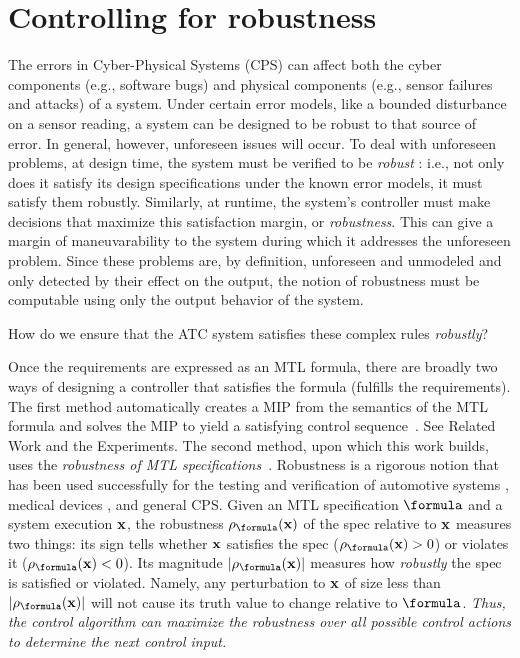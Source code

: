 \section{Controlling for robustness}
\label{sec:intro}
The errors in Cyber-Physical Systems (CPS) can affect both the cyber components (e.g., software bugs) and physical components (e.g., sensor failures and attacks) of a system. Under certain error models, like a bounded disturbance on a sensor reading, a system can be designed to be robust to that source of error.
In general, however, unforeseen issues will occur. 
To deal with unforeseen problems, at design time, the system must be verified to be \textit{robust} : i.e., not only does it satisfy its design specifications under the known error models, it must satisfy them robustly.
Similarly, at runtime, the system's controller must make decisions that maximize this satisfaction margin, or \textit{robustness}.
This can give a margin of maneuvarability to the system during which it addresses the unforeseen problem.
Since these problems are, by definition, unforeseen and unmodeled and only detected by their effect on the output, the notion of robustness must be computable using only the output behavior of the system.



How do we ensure that the ATC system satisfies these complex rules \textit{robustly}?



Once the requirements are expressed as an MTL formula, there are broadly two ways of designing a controller that satisfies the formula (fulfills the requirements).
The first method automatically creates a MIP from the semantics of the MTL formula and solves the MIP to yield a satisfying control sequence~\cite{Raman14_MPCSTL,Saha_acc16}.
See Related Work and the Experiments.
The second method, upon which this work builds, uses the \textit{robustness of MTL specifications}~\cite{Fainekos2006_TLVerifSimu,Donze2010}.
Robustness is a rigorous notion that has been used successfully for the testing and verification of automotive systems \cite{Fainekos12_Automotive,Dreossi15_RRTFalsification}, medical devices \cite{SankaranarayananF2012cmsb}, and general CPS.
Given an MTL specification $\formula$ and a system execution $\mathbf{x}$, the robustness $\robf(\sstraj)$ of the spec relative to $\mathbf{x}$ measures two things:
its sign tells whether $\mathbf{x}$ satisfies the spec ($\robf(\sstraj) > 0$) or violates it ($\robf(\sstraj) <0$).
Its magnitude $|\robf(\sstraj)|$ measures how \textit{robustly} the spec is satisfied or violated.
Namely, any perturbation to $\mathbf{x}$ of size less than $|\robf(\sstraj)|$ will not cause its truth value to change relative to $\formula$.
\textit{Thus, the control algorithm can \textit{maximize} the robustness over all possible control actions to determine the next control input.}


